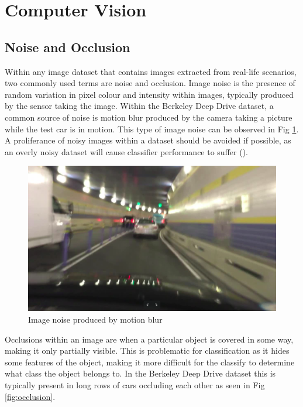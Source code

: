 \documentclass[12pt]{report}
\begin{document}
\section{Computer Vision}
\subsection{Noise and Occlusion}
\begin{flushleft}
Within any image dataset that contains images extracted from real-life scenarios, two commonly used terms are noise and occlusion. Image noise is the presence of random variation in pixel colour and intensity within images, typically produced by the sensor taking the image. Within the Berkeley Deep Drive dataset, a common source of noise is motion blur produced by the camera taking a picture while the test car is in motion. This type of image noise can be observed in Fig \ref{fig:noiseimg}. A proliferance of noisy images within a dataset should be avoided if possible, as an overly noisy dataset will cause classifier performance to suffer (\cite{xiao2015learning}).
\end{flushleft}

\vspace{0.5cm}
\begin{figure}[ht!]
	\centering
	\includegraphics[width=12cm]{noise}
	\caption{Image noise produced by motion blur}
	\label{fig:noiseimg}
\end{figure}

\newpage
\begin{flushleft}
Occlusions within an image are when a particular object is covered in some way, making it only partially visible. This is problematic for classification as it hides some features of the object, making it more difficult for the classify to determine what class the object belongs to. In the Berkeley Deep Drive dataset this is typically present in long rows of cars occluding each other as seen in Fig \ref{fig:occlusion}.
\end{flushleft}
\end{document}
